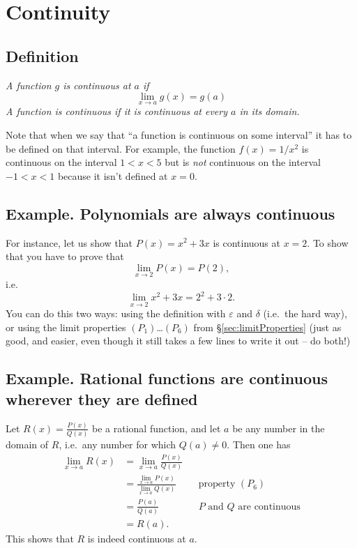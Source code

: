 \section{Continuity}
\label{sec:continuity}

\subsection{Definition}
\label{sec:03def-continuity}\itshape
A function $g$ is \emph{continuous} at $a$ if
\begin{equation}\label{eq:continuity-def}
  \lim_{x\to a} g(x) = g(a)
\end{equation}
A function is continuous if it is continuous at every $a$ in its
domain.\upshape\medskip

Note that when we say that ``a function is continuous on some
interval'' it has to be defined on that interval. For example, the
function $f(x)=1/x^2$ is continuous on the interval $1<x<5$ but is
\emph {not} continuous on the interval $-1<x<1$ because it isn't
defined at $x=0$.

\subsection{Example.  Polynomials are always continuous}
For instance, let us show that $P(x) = x^2+3x$ is continuous at $x=2$.  To
show that you have to prove that
\[
\lim_{x\to 2} P(x) = P(2),
\]
i.e.
\[
\lim_{x\to 2}x^2+3x = 2^2+3\cdot 2.
\]
You can do this two ways: using the definition with $\varepsilon$ and
$\delta$ (i.e.\ the hard way), or using the limit properties
$(P_1)$\ldots$(P_6)$ from \S\ref{sec:limitProperties} (just as good, and
easier, even though it still takes a few lines to write it out -- do both!)

\subsection{Example.  Rational functions are continuous wherever they are defined}

Let $R(x) = \frac{P(x)}{Q(x)}$ be a rational function, and let $a$ be any
number in the domain of $R$, i.e.\ any number for which $Q(a)\neq0$.  Then
one has
\begin{align*}
  \lim_{x\to a}R(x)
  &= \lim_{x\to a}\frac{P(x)}{Q(x)} && \\
  &= \frac{\lim_{x\to a} P(x)}{\lim_{x\to a}Q(x)}
  && \text{property }(P_6)\\
  &= \frac{P(a)}{Q(a)} && \text{$P$ and $Q$ are continuous}\\
  &= R(a).
\end{align*}
This shows that $R$ is indeed continuous at $a$.


